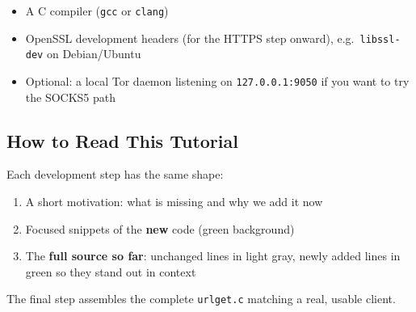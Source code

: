 \begin{itemize}[leftmargin=1.4em]
    \item A C compiler (\texttt{gcc} or \texttt{clang})
    \item OpenSSL development headers (for the HTTPS step onward), e.g.\
          \texttt{libssl-dev} on Debian/Ubuntu
    \item Optional: a local Tor daemon listening on \texttt{127.0.0.1:9050}
          if you want to try the SOCKS5 path
\end{itemize}

\subsection{How to Read This Tutorial}

Each development step has the same shape:

\begin{enumerate}[leftmargin=1.4em]
    \item A short motivation: what is missing and why we add it now
    \item Focused snippets of the \textbf{new} code (green background)
    \item The \textbf{full source so far}: unchanged lines in light gray,
          newly added lines in green so they stand out in context
\end{enumerate}

The final step assembles the complete \texttt{urlget.c} matching a real,
usable client.
